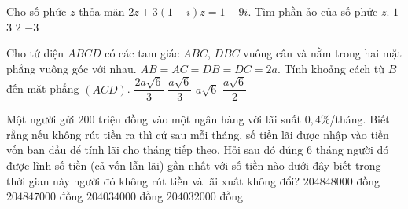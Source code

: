 \begin{ex}%
	Cho số phức $z$ thỏa mãn $2z+3(1-i)\overline{z}=1-9i$. Tìm phần ảo  của số phức $\overline{z}$. 
	\choice
	{$ 1 $}
	{$ 3 $}
	{$ 2 $}
	{\True $ -3 $}
\end{ex}
\begin{ex}%
	Cho tứ diện $ABCD$ có các tam giác $ABC$, $DBC$ vuông cân và nằm trong hai mặt phẳng vuông góc với nhau. $AB=AC=DB=DC=2a$.  Tính khoảng cách từ $B$ đến mặt phẳng $(ACD)$.
	\choice
	{\True	$\dfrac{2a\sqrt{6}}{3}$}
	{$\dfrac{a\sqrt{6}}{3}$}
	{$a\sqrt{6}$}
	{$\dfrac{a\sqrt{6}}{2}$}
\end{ex}

\begin{ex}%
	Một người gửi $200$ triệu đồng vào một ngân hàng với lãi suất $0{,}4\%$/tháng. Biết rằng nếu không rút tiền ra thì cứ sau mỗi tháng, số tiền lãi được nhập vào tiền vốn ban đầu để tính lãi cho tháng tiếp theo. Hỏi sau đó đúng $6$ tháng người đó được lĩnh số tiền (cả vốn lẫn lãi) gần nhất với số tiền nào dưới đây biết trong thời gian này người đó không rút tiền và lãi xuất không đổi?
	\choice
	{\True $204848000$ đồng}
	{$204847000$ đồng}
	{$204034000$ đồng}
	{$204032000$ đồng}
\end{ex}

